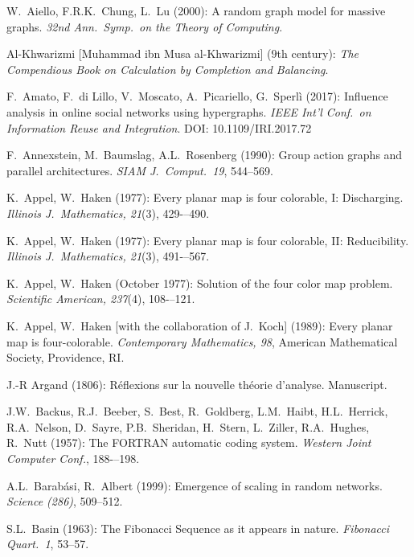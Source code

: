 
\begin{thebibliography}{999}
 

W.~Aiello, F.R.K.~Chung, L.~Lu (2000):
A random graph model for massive graphs.
{\it 32nd Ann.~Symp.~on the Theory of Computing}.

Al-Khwarizmi [Muhammad ibn Musa al-Khwarizmi] ($9$th century):
{\it The Compendious Book on Calculation by Completion and
  Balancing}.

F.~Amato, F.~di Lillo, V.~Moscato, A.~Picariello, G.~Sperlì (2017):
Influence analysis in online social networks using hypergraphs.
{\it IEEE Int'l Conf.~on Information Reuse and Integration}.
DOI: 10.1109/IRI.2017.72

F.~Annexstein, M.~Baumslag, A.L.~Rosenberg (1990):
Group action graphs and parallel architectures.
{\it SIAM J.~Comput.~19}, 544--569.

K.~Appel, W.~Haken (1977):
Every planar map is four colorable, I: Discharging.
{\it Illinois J.~Mathematics, 21}(3), 429-–490.

K.~Appel, W.~Haken (1977):
Every planar map is four colorable, II: Reducibility.
{\it Illinois J.~Mathematics, 21}(3), 491-–567.

K.~Appel, W.~Haken (October 1977):
Solution of the four color map problem.
{\it Scientific American, 237}(4), 108-–121.

K.~Appel, W.~Haken [with the collaboration of J.~Koch] (1989):
Every planar map is four-colorable.
{\it Contemporary Mathematics, 98},
American Mathematical Society, Providence, RI.

J.-R Argand (1806):
R\'{e}flexions sur la nouvelle th\'{e}orie d'analyse.  Manuscript.


J.W.~Backus, R.J.~Beeber, S.~Best, R.~Goldberg, L.M.~Haibt,
H.L.~Herrick, R.A.~Nelson, D.~Sayre, P.B.~Sheridan, H.~Stern,
L.~Ziller, R.A.~Hughes, R.~Nutt (1957):
The FORTRAN automatic coding system.  {\it Western Joint Computer
Conf.}, 188-–198.

A.L.~Barab\'{a}si, R.~Albert (1999):
Emergence of scaling in random networks.
{\it Science (286)}, 509--512.

S.L.~Basin (1963): The Fibonacci Sequence as it appears in nature.
{\it Fibonacci Quart.~1}, 53--57.


\end{thebibliography}
